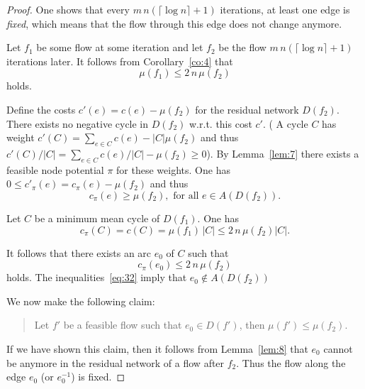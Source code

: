 \begin{proof}
  One shows that every $m\, n  (\lceil\log n\rceil+1)$ iterations, at least one
  edge is \emph{fixed}, which means that the flow through  this edge
  does not change anymore. 
  
  Let $f_1$ be some flow at some iteration and let $f_2$ be the flow
  $m\, n  (\lceil\log n\rceil+1)$ iterations later. 
  It follows from Corollary~\ref{co:4} that 
  \begin{equation}
    \label{eq:33}
    \mu(f_1)\leq 2 \, n \, \mu(f_2) 
  \end{equation}
  holds. 
  
  Define the costs $c'(e) = c(e) - \mu(f_2)$ for the residual network
  $D(f_2)$. There exists no negative cycle in $D(f_2)$ w.r.t. this
  cost $c'$. ( A cycle $C$ has weight $c'(C) = \sum_{e\in C} c(e) - |C|
  \mu(f_2)$ and thus $c'(C) / |C| = \sum_{e\in C} c(e) / |C| - \mu(f_2)\geq0$).
  By Lemma~\ref{lem:7} there exists a feasible node potential $\pi$ for
  these weights. One has $0 \leq c'_\pi(e) = c_\pi(e) - \mu(f_2)$ and thus
  \begin{equation}
    \label{eq:32}
     c_\pi(e) \geq \mu(f_2), \text{ for all } e \in A(D(f_2)). 
  \end{equation}

  Let $C$ be a minimum mean cycle of $D(f_1)$. One has
  \begin{equation}
    \label{eq:34}
    c_\pi(C) = c(C) = \mu(f_1) \, |C| \leq 2 \, n \, \mu(f_2) |C|.
  \end{equation}
  
  It follows that there exists an arc $e_0$ of $C$ such that
  \begin{equation}
    \label{eq:36}
    c_\pi(e_0)\leq 2 \, n \, \mu(f_2)
  \end{equation}
  holds. The inequalities~\eqref{eq:32}
  imply that  $e_0 \notin A(D(f_2))$ 

  We now make the following
  claim:
  \begin{quote}
    Let $f'$ be a feasible flow such that $e_0 \in D(f')$, then 
    $\mu(f') \leq    \mu(f_2)$. 
  \end{quote}
  
  If we have shown this claim, then it follows from Lemma~\ref{lem:8}
  that $e_0$ cannot be anymore in the residual network of a flow after
  $f_2$.  Thus the flow along the edge $e_0$ (or $e_0^{-1}$) is
  fixed. 


\end{proof}
